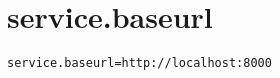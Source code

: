 \section{service.baseurl}
\label{configuration:ServiceBaseurl}
\ClearAPI
\TODO
{}
\begin{lstlisting}[style=Props,caption={Usage example for \textit{service.baseurl}}]
service.baseurl=http://localhost:8000
\end{lstlisting}